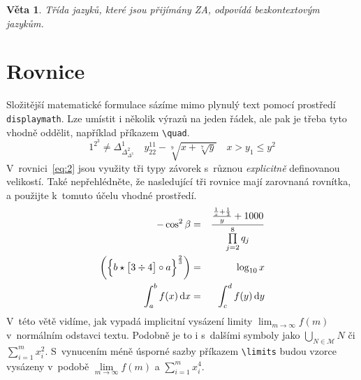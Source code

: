 \documentclass[twocolumn,a4paper,11pt]{article}
\newtheorem{veta}{Věta}
\begin{document}
\begin{veta}Třída jazyků, které jsou přijímány ZA, odpovídá \textup{bezkontextovým jazykům}.\end{veta}

\section{Rovnice}
\label{sec:rovnice}
Složitější matematické formulace sázíme mimo plynulý text pomocí prostředí \verb|displaymath|. Lze umístit i několik výrazů na jeden řádek, ale pak je třeba tyto vhodně oddělit, například příkazem \verb|\quad|.
\[1^{2^3}\neq \Delta^1_{\Delta^2_{\Delta^3}}\quad y^{11}_{22}-\sqrt[9]{x+\sqrt[7]{y}}\quad x > y_1\leq y^2\]
V~rovnici~\eqref{eq:2} jsou využity tři typy závorek s~různou \emph{explicitně} definovanou velikostí. Také nepřehlédněte, že nasledující tři rovnice mají zarovnaná rovnítka, a použijte k~tomuto účelu vhodné prostředí.
\begin{eqnarray}
    -\cos^2\beta & = & \frac{\frac{\frac{1}{x}+\frac{1}{3}}{y}+1000}{\prod\limits_{j=2}^8 q_j} \label{eq:1} \\ 
    \biggl(\Bigl\{ b\star\bigl[3 \div 4\bigr]\circ a\Bigr\}^\frac{2}{3}\biggr) & = & \log_{10} x \label{eq:2} \\
    \int_a^b f(x)\,\mathrm{d}x & = & \int_c^d f(y)\,\mathrm{d}y \label{eq:3}
\end{eqnarray}
V~této větě vidíme, jak vypadá implicitní vysázení limity $\lim_{m \to \infty} f(m)$ v~normálním odstavci textu. Podobně je to i s~dalšími symboly jako $\bigcup_{N\in\mathcal{M}} N$ či $\sum^{m}_{i=1} x^2_i$.
S~vynucením méně úsporné sazby příkazem \verb|\limits| budou vzorce vysázeny v~podobě $\lim\limits_{m\to \infty} f(m)$ a $\sum\limits_{i=1}^{m} x^{4}_{i}$.
\end{document}
